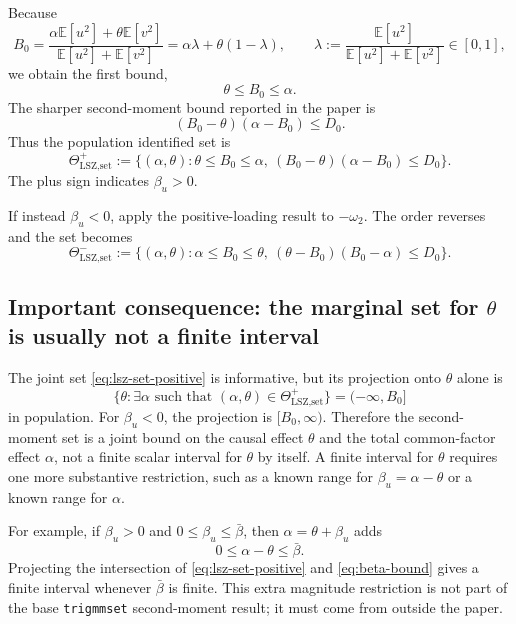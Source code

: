 \documentclass[11pt]{article}
\newcommand{\E}{\mathbb{E}}
\theoremstyle{plain}
\theoremstyle{definition}
\theoremstyle{remark}
\begin{document}
Because
\begin{equation}
B_0=
\frac{\alpha\E[u^2]+\theta\E[v^2]}{\E[u^2]+\E[v^2]}
=\alpha\lambda+\theta(1-\lambda),
\qquad
\lambda:=\frac{\E[u^2]}{\E[u^2]+\E[v^2]}\in[0,1],
\label{eq:B0-convex}
\end{equation}
we obtain the first bound,
\begin{equation}
\theta\le B_0\le\alpha.
\label{eq:lsz-order}
\end{equation}
The sharper second-moment bound reported in the paper is
\begin{equation}
(B_0-\theta)(\alpha-B_0)\le D_0.
\label{eq:lsz-hyperbola}
\end{equation}
Thus the population identified set is
\begin{equation}
\Theta_{\text{LSZ,set}}^+ :=
\{(\alpha,\theta):\theta\le B_0\le\alpha,
\ (B_0-\theta)(\alpha-B_0)\le D_0\}.
\label{eq:lsz-set-positive}
\end{equation}
The plus sign indicates $\beta_u>0$.

If instead $\beta_u<0$, apply the positive-loading result to $-\omega_2$. The order
reverses and the set becomes
\begin{equation}
\Theta_{\text{LSZ,set}}^- :=
\{(\alpha,\theta):\alpha\le B_0\le\theta,
\ (\theta-B_0)(B_0-\alpha)\le D_0\}.
\label{eq:lsz-set-negative}
\end{equation}

\subsection{Important consequence: the marginal set for $\theta$ is usually not a finite interval}

The joint set \eqref{eq:lsz-set-positive} is informative, but its projection onto
$\theta$ alone is
\begin{equation}
\{\theta:\exists\alpha\text{ such that }(\alpha,\theta)\in
\Theta_{\text{LSZ,set}}^+\}=(-\infty,B_0]
\label{eq:theta-halfline-plus}
\end{equation}
in population. For $\beta_u<0$, the projection is $[B_0,\infty)$. Therefore the
second-moment set is a joint bound on the causal effect $\theta$ and the total
common-factor effect $\alpha$, not a finite scalar interval for $\theta$ by itself.
A finite interval for $\theta$ requires one more substantive restriction, such as a
known range for $\beta_u=\alpha-\theta$ or a known range for $\alpha$.

For example, if $\beta_u>0$ and $0\le \beta_u\le\bar\beta$, then
$\alpha=\theta+\beta_u$ adds
\begin{equation}
0\le \alpha-\theta\le\bar\beta.
\label{eq:beta-bound}
\end{equation}
Projecting the intersection of \eqref{eq:lsz-set-positive} and
\eqref{eq:beta-bound} gives a finite interval whenever $\bar\beta$ is finite.
This extra magnitude restriction is not part of the base \texttt{trigmmset}
second-moment result; it must come from outside the paper.
\end{document}
